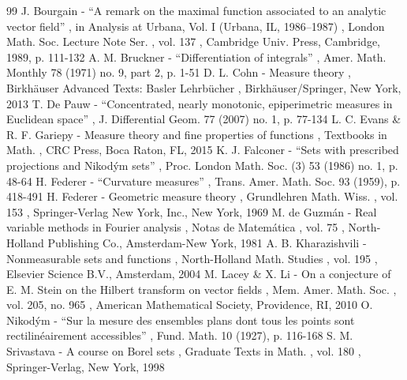 \documentclass[11pt]{article}
\theoremstyle{definition}
\theoremstyle{jepanonymous}
\theoremstyle{plain}
\begin{document}
\begin{thebibliography}{99}
 J. Bourgain - “A remark on the maximal function associated to an analytic vector field” , in Analysis at Urbana, Vol. I (Urbana, IL, 1986–1987) , London Math. Soc. Lecture Note Ser. , vol. 137 , Cambridge Univ. Press, Cambridge, 1989, p. 111-132
 A. M. Bruckner - “Differentiation of integrals” , Amer. Math. Monthly 78 (1971) no. 9, part 2, p. 1-51
 D. L. Cohn - Measure theory , Birkhäuser Advanced Texts: Basler Lehrbücher , Birkhäuser/Springer, New York, 2013
 T. De Pauw - “Concentrated, nearly monotonic, epiperimetric measures in Euclidean space” , J. Differential Geom. 77 (2007) no. 1, p. 77-134
 L. C. Evans \& R. F. Gariepy - Measure theory and fine properties of functions , Textbooks in Math. , CRC Press, Boca Raton, FL, 2015
 K. J. Falconer - “Sets with prescribed projections and Nikodým sets” , Proc. London Math. Soc. (3) 53 (1986) no. 1, p. 48-64
 H. Federer - “Curvature measures” , Trans. Amer. Math. Soc. 93 (1959), p. 418-491
 H. Federer - Geometric measure theory , Grundlehren Math. Wiss. , vol. 153 , Springer-Verlag New York, Inc., New York, 1969
 M. de Guzmán - Real variable methods in Fourier analysis , Notas de Matemática , vol. 75 , North-Holland Publishing Co., Amsterdam-New York, 1981
 A. B. Kharazishvili - Nonmeasurable sets and functions , North-Holland Math. Studies , vol. 195 , Elsevier Science B.V., Amsterdam, 2004
 M. Lacey \& X. Li - On a conjecture of E. M. Stein on the Hilbert transform on vector fields , Mem. Amer. Math. Soc. , vol. 205, no. 965 , American Mathematical Society, Providence, RI, 2010
 O. Nikodým - “Sur la mesure des ensembles plans dont tous les points sont rectilinéairement accessibles” , Fund. Math. 10 (1927), p. 116-168
 S. M. Srivastava - A course on Borel sets , Graduate Texts in Math. , vol. 180 , Springer-Verlag, New York, 1998
\end{thebibliography}
\end{document}
